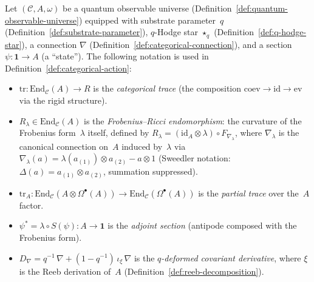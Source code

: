 \begin{remark}
\label{rem:categorical-action-notation}
Let $(\mathcal{C}, A, \omega)$ be a quantum observable universe
(Definition~\ref{def:quantum-observable-universe}) equipped with
substrate parameter~$q$ (Definition~\ref{def:substrate-parameter}),
$q$-Hodge star $\star_q$ (Definition~\ref{def:q-hodge-star}),
a connection $\nabla$ (Definition~\ref{def:categorical-connection}),
and a section $\psi \colon \mathbf{1} \to A$ (a ``state'').
The following notation is used in
Definition~\ref{def:categorical-action}:
\begin{itemize}
  \item $\mathrm{tr} \colon \mathrm{End}_{\mathcal{C}}(A) \to R$ is the
        \emph{categorical trace} (the composition
        $\mathrm{coev} \to \mathrm{id} \to \mathrm{ev}$ via the rigid
        structure).
  \item $R_\lambda \in \mathrm{End}_{\mathcal{C}}(A)$ is the
        \emph{Frobenius--Ricci endomorphism}: the curvature of the
        Frobenius form~$\lambda$ itself, defined by
        $R_\lambda = (\mathrm{id}_A \otimes \lambda) \circ F_{\nabla_\lambda}$,
        where $\nabla_\lambda$ is the canonical connection on~$A$ induced
        by~$\lambda$ via $\nabla_\lambda(a) = \lambda(a_{(1)}) \otimes
        a_{(2)} - a \otimes 1$
        (Sweedler notation: $\Delta(a) = a_{(1)} \otimes a_{(2)}$,
        summation suppressed).
  \item $\mathrm{tr}_A \colon
        \mathrm{End}_{\mathcal{C}}(A \otimes \Omega^{\bullet}(A)) \to
        \mathrm{End}_{\mathcal{C}}(\Omega^{\bullet}(A))$ is the
        \emph{partial trace} over the~$A$ factor.
  \item $\psi^* = \lambda \circ S(\psi) \colon A \to \mathbf{1}$ is the
        \emph{adjoint section} (antipode composed with the Frobenius form).
  \item $D_\nabla = q^{-1}\,\nabla + (1 - q^{-1})\,\iota_\xi\,\nabla$ is
        the \emph{$q$-deformed covariant derivative}, where $\xi$ is the
        Reeb derivation of~$A$
        (Definition~\ref{def:reeb-decomposition}).
\end{itemize}
\end{remark}

